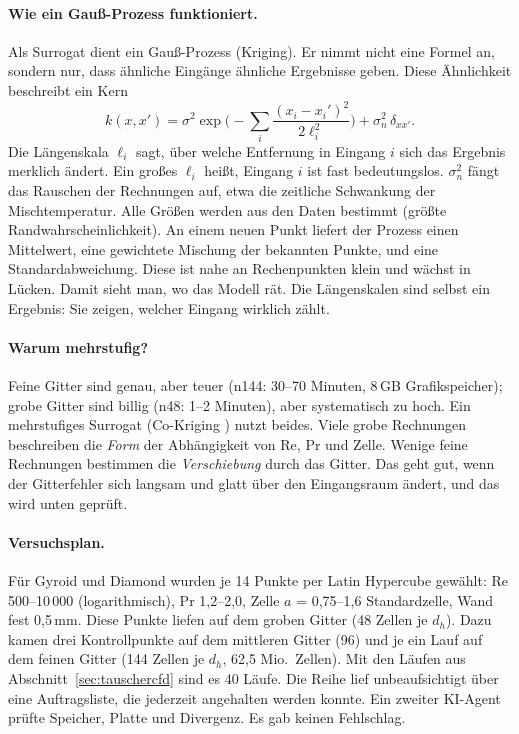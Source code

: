 \paragraph{Wie ein Gauß-Prozess funktioniert.} Als Surrogat dient ein Gauß-Prozess (Kriging). Er nimmt nicht eine
Formel an, sondern nur, dass ähnliche Eingänge ähnliche Ergebnisse geben. Diese Ähnlichkeit beschreibt ein Kern
\[
  k(x,x') = \sigma^2 \exp\Big(-\sum_i \frac{(x_i-x_i')^2}{2\ell_i^2}\Big) + \sigma_n^2\,\delta_{xx'}.
\]
Die Längenskala $\ell_i$ sagt, über welche Entfernung in Eingang $i$ sich das Ergebnis merklich ändert. Ein großes
$\ell_i$ heißt, Eingang $i$ ist fast bedeutungslos. $\sigma_n^2$ fängt das Rauschen der Rechnungen auf, etwa die
zeitliche Schwankung der Mischtemperatur. Alle Größen werden aus den Daten bestimmt (größte Randwahrscheinlichkeit).
An einem neuen Punkt liefert der Prozess einen Mittelwert, eine gewichtete Mischung der bekannten Punkte, und eine
Standardabweichung. Diese ist nahe an Rechenpunkten klein und wächst in Lücken. Damit sieht man, wo das Modell rät.
Die Längenskalen sind selbst ein Ergebnis: Sie zeigen, welcher Eingang wirklich zählt.

\paragraph{Warum mehrstufig?} Feine Gitter sind genau, aber teuer (n144: 30--70 Minuten, 8\,GB Grafikspeicher); grobe
Gitter sind billig (n48: 1--2 Minuten), aber systematisch zu hoch. Ein mehrstufiges Surrogat (Co-Kriging
\cite{kennedy2000}) nutzt beides. Viele grobe Rechnungen beschreiben die \emph{Form} der Abhängigkeit von Re, Pr und
Zelle. Wenige feine Rechnungen bestimmen die \emph{Verschiebung} durch das Gitter. Das geht gut, wenn der Gitterfehler
sich langsam und glatt über den Eingangsraum ändert, und das wird unten geprüft.

\paragraph{Versuchsplan.} Für Gyroid und Diamond wurden je 14 Punkte per Latin Hypercube \cite{mckay1979} gewählt:
Re 500--10\,000 (logarithmisch), Pr 1,2--2,0, Zelle $a$ = 0,75--1,6 Standardzelle, Wand fest 0,5\,mm. Diese Punkte
liefen auf dem groben Gitter (48 Zellen je $d_h$). Dazu kamen drei Kontrollpunkte auf dem mittleren Gitter (96) und je
ein Lauf auf dem feinen Gitter (144 Zellen je $d_h$, 62,5 Mio.\ Zellen). Mit den Läufen aus
Abschnitt~\ref{sec:tauschercfd} sind es 40 Läufe. Die Reihe lief unbeaufsichtigt über eine Auftragsliste, die
jederzeit angehalten werden konnte. Ein zweiter KI-Agent prüfte Speicher, Platte und Divergenz. Es gab keinen
Fehlschlag.

